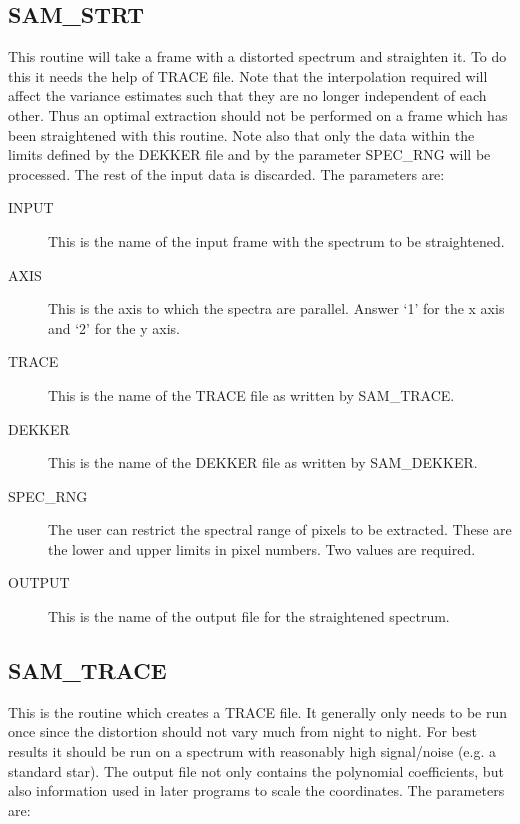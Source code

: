 \subsection{SAM\_STRT}

This routine will take a frame with a distorted spectrum and straighten it. To
do this it needs the help of TRACE file.  Note that the interpolation required
will affect the variance estimates such that they are no longer independent of
each other.  Thus an optimal extraction should not be  performed on a frame
which has been straightened with this routine.  Note also that only the data
within the limits defined by the DEKKER file and by the parameter SPEC\_RNG
will be processed.  The rest of the input data is discarded. The parameters
are:

\begin{description}
\begin{description}

\item[INPUT] This is the name of the input frame with the spectrum to be 
straightened.

\item[AXIS] This is the axis to which the spectra are parallel.  Answer `1' for
the x axis and `2' for the y axis.

\item[TRACE] This is the name of the TRACE file as written by SAM\_TRACE.

\item[DEKKER] This is the name of the DEKKER file as written by SAM\_DEKKER.

\item[SPEC\_RNG] The user can restrict the spectral range of pixels to be extracted.
These are the lower and upper limits in pixel numbers.  Two values are
required.

\item[OUTPUT] This is the name of the output file for the straightened
spectrum.

\end{description}
\end{description}

\subsection{SAM\_TRACE}

This is the routine which creates a TRACE file.  It generally only needs to be
run once since the distortion should not vary much from night to night.  For
best results it should be run on a spectrum with reasonably high  signal/noise
(e.g. a standard star).  The output file not only contains the polynomial
coefficients, but also information used in later programs to scale the
coordinates.  The parameters are:

